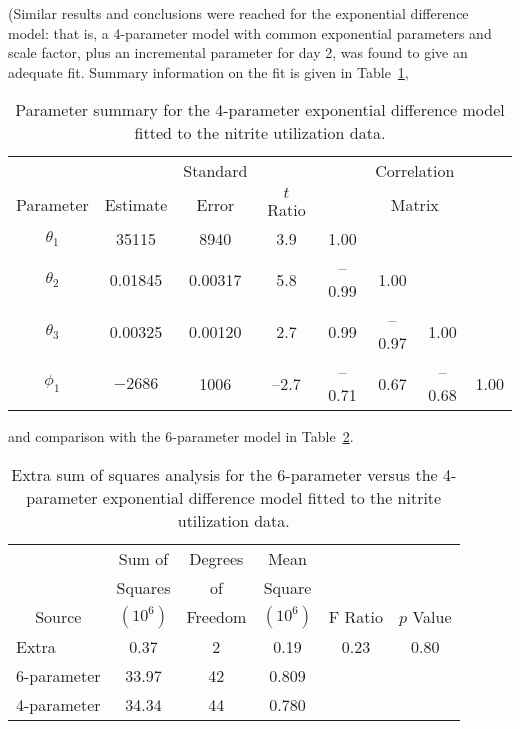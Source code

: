 (Similar results and conclusions were reached for the exponential
difference model:  that is, a 4-parameter model with common
exponential parameters and scale factor, plus an incremental
parameter for day 2, was found to give an adequate fit.
Summary information on the fit is given in
Table~\ref{tbl:3.9},
\begin{table}
  \caption{Parameter summary for the 4-parameter exponential
    difference model fitted to the nitrite utilization data.}
  \label{tbl:3.9}
  \begin{center}
    \begin{tabular}{cccccccc} \hline
      &&\multicolumn{1}{c}{Standard} &&
      \multicolumn{4}{c}{Correlation}\\
      \multicolumn{1}{c}{Parameter} & \multicolumn{1}{c}{Estimate} &
      \multicolumn{1}{c}{Error} & \multicolumn{1}{c}{$t$ Ratio} &
      \multicolumn{4}{c}{Matrix}\\ \hline
      $\theta_{1}$&35115&8940&3.9&1.00\\
      $\theta_{2}$&0.01845&0.00317&5.8&--\/0.99&1.00\\
      $\theta_{3}$&0.00325&0.00120&2.7&0.99&--\/0.97&1.00\\
      $\phi_{1}$&$-2686$&1006&--2.7&--\/0.71&0.67&--\/0.68&1.00\\ \hline
    \end{tabular}
  \end{center}
\end{table}
and comparison with
the 6-parameter model in Table~\ref{tbl:3.10}.
\begin{table}
  \caption{
  Extra sum of squares analysis for the 6-parameter
  versus the 4-parameter exponential difference model
  fitted to the nitrite utilization data.
  }\label{tbl:3.10}
  \begin{center}
    \begin{tabular}{lccccc} \hline
      & \multicolumn{1}{c}{Sum of} & \multicolumn{1}{c}{Degrees} &
      \multicolumn{1}{c}{Mean}\\
      & \multicolumn{1}{c}{Squares} & \multicolumn{1}{c}{of} &
      \multicolumn{1}{c}{Square}\\
      \multicolumn{1}{c}{Source} & \multicolumn{1}{c}{$( 10^6 )$} &
      \multicolumn{1}{c}{Freedom} & \multicolumn{1}{c}{$( 10^6 )$} &
      \multicolumn{1}{c}{F Ratio} & \multicolumn{1}{c}{$p$ Value}\\ \hline
      Extra&0.37&2&0.19&0.23&0.80\\
      6-parameter&33.97&42&0.809\\ \hline
      4-parameter&34.34&44&0.780\\ \hline
    \end{tabular}
  \end{center}
\end{table}

